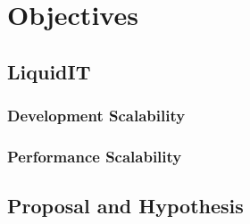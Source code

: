 \section{Objectives}

\subsection{LiquidIT}

\subsubsection{Development Scalability}

\subsubsection{Performance Scalability}

\subsection{Proposal and Hypothesis}
